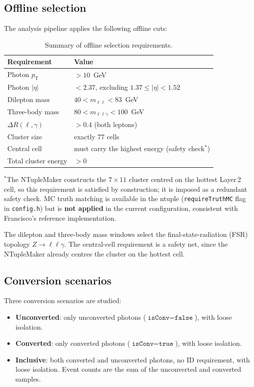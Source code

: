 \documentclass[11pt,a4paper]{article}
\newcommand{\abseta}{\ensuremath{|\eta|}}
\newcommand{\pt}{\ensuremath{p_{\mathrm{T}}}}
\begin{document}
\subsection{Offline selection}
\label{sec:offline-selection}

The analysis pipeline applies the following offline cuts:

\begin{table}[htbp]
\centering
\caption{Summary of offline selection requirements.}
\label{tab:selection}
\begin{tabular}{ll}
\toprule
Requirement & Value \\
\midrule
Photon \pt         & $> 10$~GeV \\
Photon $\abseta$   & $< 2.37$, excluding $1.37 \leq \abseta < 1.52$ \\
Dilepton mass      & $40 < m_{\ell\ell} < 83$~GeV \\
Three-body mass    & $80 < m_{\ell\ell\gamma} < 100$~GeV \\
$\Delta R(\ell, \gamma)$ & $> 0.4$ (both leptons) \\
Cluster size       & exactly 77 cells \\
Central cell       & must carry the highest energy (safety check$^{*}$) \\
Total cluster energy & $> 0$ \\
\bottomrule
\end{tabular}
\smallskip

\noindent$^{*}$The NTupleMaker constructs the $7\times11$ cluster
centred on the hottest Layer\,2 cell, so this requirement is satisfied
by construction; it is imposed as a redundant safety check.
MC truth matching is available in the ntuple (\texttt{requireTruthMC}
flag in \texttt{config.h}) but is \textbf{not applied} in the current
configuration, consistent with Francisco's reference implementation.
\end{table}

The dilepton and three-body mass windows select the final-state-radiation
(FSR) topology $Z \to \ell\ell\gamma$.  The central-cell requirement
is a safety net, since the NTupleMaker already centres the cluster on
the hottest cell.

\subsection{Conversion scenarios}
\label{sec:conversion-scenarios}

Three conversion scenarios are studied:
\begin{itemize}
  \item \textbf{Unconverted}: only unconverted photons
        ($\texttt{isConv} = \texttt{false}$), with loose isolation.
  \item \textbf{Converted}: only converted photons
        ($\texttt{isConv} = \texttt{true}$), with loose isolation.
  \item \textbf{Inclusive}: both converted and unconverted photons,
        no ID requirement, with loose isolation.  Event counts are the
        sum of the unconverted and converted samples.
\end{itemize}
\end{document}
